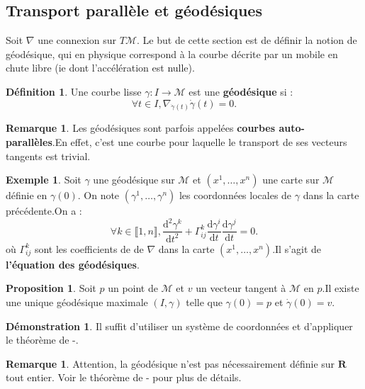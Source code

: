 \documentclass[12pt,a4paper]{article}
\theoremstyle{definition}
\newtheorem{prop}[thm]{Proposition}
\newtheorem{defn}[thm]{Définition}
\newtheorem{ex}[thm]{Exemple}
\newtheorem{rqe}[thm]{Remarque}
\newtheorem*{dem}{Démonstration}
\begin{document}
\subsection{Transport parallèle et géodésiques}
Soit $\nabla$ une connexion sur $T\mathcal{M}$. Le but de cette section est de définir la notion de géodésique, qui en physique correspond à la courbe décrite par un mobile en chute libre (ie dont l'accélération est nulle).
\begin{defn}
Une courbe lisse $\gamma:I\to\mathcal{M}$ est une \textbf{géodésique} si :
$$\forall t\in I, \nabla_{\dot{\gamma}(t)}\dot{\gamma}(t)=0.$$
\end{defn}
\begin{rqe}
Les géodésiques sont parfois appelées \textbf{courbes auto-parallèles}.\newline En effet, c'est une courbe pour laquelle le transport de ses vecteurs tangents est trivial.
\end{rqe}
\begin{ex}
Soit $\gamma$ une géodésique sur $\mathcal{M}$ et $(x^1,\ldots,x^n)$ une carte sur $\mathcal{M}$ définie en $\gamma(0)$. On note $(\gamma^1,\ldots,\gamma^n)$ les coordonnées locales de $\gamma$ dans la carte précédente.\newline On a :
$$
\forall k\in\llbracket 1,n\rrbracket, \dfrac{\mathrm{d}^2\gamma^k}{\mathrm{d}t^2}+\Gamma_{ij}^k\dfrac{\mathrm{d}\gamma^i}{\mathrm{d}t}\dfrac{\mathrm{d}\gamma^j}{\mathrm{d}t}=0.
$$
où $\Gamma_{ij}^k$ sont les coefficients de  de $\nabla$ dans la carte $(x^1,\ldots,x^n)$.\newline Il s'agit de \textbf{l'équation des géodésiques}.
\end{ex}
\begin{prop}
Soit $p$ un point de $\mathcal{M}$ et $v$ un vecteur tangent à $\mathcal{M}$ en $p$.\newline Il existe une unique géodésique maximale $(I,\gamma)$ telle que $\gamma(0)=p$ et $\dot{\gamma}(0)=v$.
\end{prop}
\begin{dem}
Il suffit d'utiliser un système de coordonnées et d'appliquer le théorème de -.
\end{dem}
\begin{rqe}
Attention, la géodésique n'est pas nécessairement définie sur $\mathbf{R}$ tout entier. Voir le théorème de - pour plus de détails.
\end{rqe}
\newpage
\end{document}
